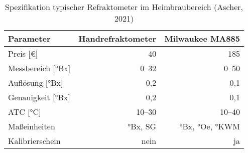 \documentclass[a4paper,parskip=half]{scrartcl}
\begin{document}
\parencite{Zainasheff2007}


\begin{table}[h]
\centering
\begin{tabular}{lrr}
\toprule
Parameter &  Handrefraktometer &  Milwaukee MA885 \\
\midrule
Preis [€] & 40 & 185 \\
Messbereich [°Bx] & 0--32 & 0--50 \\
Auflösung [°Bx] & 0,2 & 0,1 \\
Genauigkeit [°Bx] & 0,2 & 0,1 \\
ATC [°C] & 10--30 & 10--40 \\
Maßeinheiten & °Bx, SG & °Bx, °Oe, °KWM \\
Kalibrierschein & nein & ja \\
\bottomrule
\end{tabular}
\caption{Spezifikation typischer Refraktometer im Heimbraubereich  (Ascher, 2021)}
\label{table:refactospec}
\end{table}

\printbibliography[title=Quellen]
\end{document}
